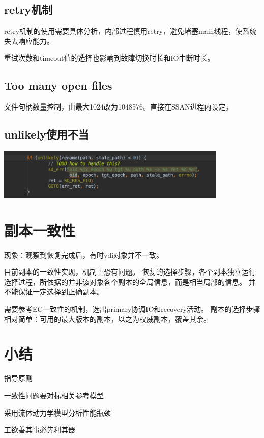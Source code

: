 \subsection{retry机制}

retry机制的使用需要具体分析，内部过程慎用retry，避免堵塞main线程，使系统失去响应能力。

重试次数和timeout值的选择也影响到故障切换时长和IO中断时长。

\subsection{Too many open files}

文件句柄数量控制，由最大1024改为1048576。直接在SSAN进程内设定。

\subsection{unlikely使用不当}

\includegraphics[width=11cm]{../imgs/unlikely.png}

\section{副本一致性}

现象：观察到恢复完成后，有时vdi对象并不一致。

目前副本的一致性实现，机制上恐有问题。
恢复的选择步骤，各个副本独立运行选择过程，所依据的并非该对象各个副本的全局信息，而是相当局部的信息。
并不能保证一定选择到正确副本。

需要参考EC一致性的机制，选出primary协调IO和recovery活动。
副本的选择步骤相对简单：可用的最大版本的副本，以之为权威副本，覆盖其余。

\section{小结}

指导原则
\begin{enumbox}
\item 一致性问题要对标相关参考模型
\item 采用流体动力学模型分析性能瓶颈
\item 工欲善其事必先利其器
\end{enumbox}

